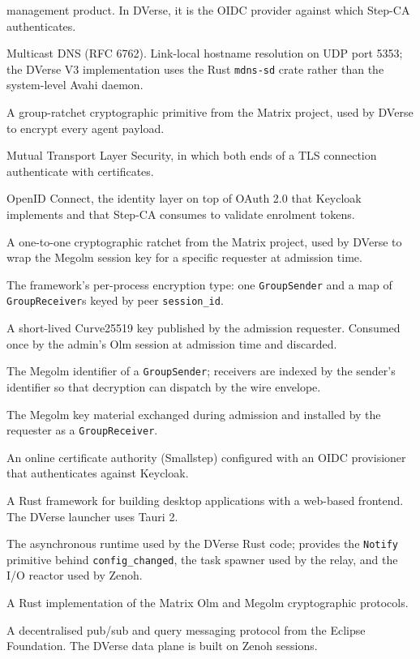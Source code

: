 \documentclass[11pt,a4paper]{article}
\begin{document}
\begin{description}[leftmargin=2.4cm, style=nextline, font=\sffamily\bfseries]
        management product. In DVerse, it is the OIDC provider
        against which Step-CA authenticates.
  \item[mDNS] Multicast DNS (RFC 6762). Link-local hostname
        resolution on UDP port 5353; the DVerse V3
        implementation uses the Rust \texttt{mdns-sd} crate
        rather than the system-level Avahi daemon.
  \item[Megolm] A group-ratchet cryptographic primitive from
        the Matrix project, used by DVerse to encrypt every
        agent payload.
  \item[mTLS] Mutual Transport Layer Security, in which both
        ends of a TLS connection authenticate with
        certificates.
  \item[OIDC] OpenID Connect, the identity layer on top of
        OAuth 2.0 that Keycloak implements and that Step-CA
        consumes to validate enrolment tokens.
  \item[Olm] A one-to-one cryptographic ratchet from the
        Matrix project, used by DVerse to wrap the Megolm
        session key for a specific requester at admission
        time.
  \item[\texttt{PayloadCipher}] The framework's per-process
        encryption type: one \texttt{GroupSender} and a map
        of \texttt{GroupReceiver}s keyed by peer
        \texttt{session\_id}.
  \item[prekey] A short-lived Curve25519 key published by the
        admission requester. Consumed once by the admin's Olm
        session at admission time and discarded.
  \item[\texttt{session\_id}] The Megolm identifier of a
        \texttt{GroupSender}; receivers are indexed by the
        sender's identifier so that decryption can dispatch
        by the wire envelope.
  \item[\texttt{SessionKey}] The Megolm key material
        exchanged during admission and installed by the
        requester as a \texttt{GroupReceiver}.
  \item[Step-CA] An online certificate authority (Smallstep)
        configured with an OIDC provisioner that
        authenticates against Keycloak.
  \item[Tauri] A Rust framework for building desktop
        applications with a web-based frontend. The DVerse
        launcher uses Tauri 2.
  \item[tokio] The asynchronous runtime used by the DVerse
        Rust code; provides the \texttt{Notify} primitive
        behind \texttt{config\_changed}, the task spawner used
        by the relay, and the I/O reactor used by Zenoh.
  \item[vodozemac] A Rust implementation of the Matrix Olm
        and Megolm cryptographic protocols.
  \item[Zenoh] A decentralised pub/sub and query messaging
        protocol from the Eclipse Foundation. The DVerse data
        plane is built on Zenoh sessions.
\end{description}



\end{document}
